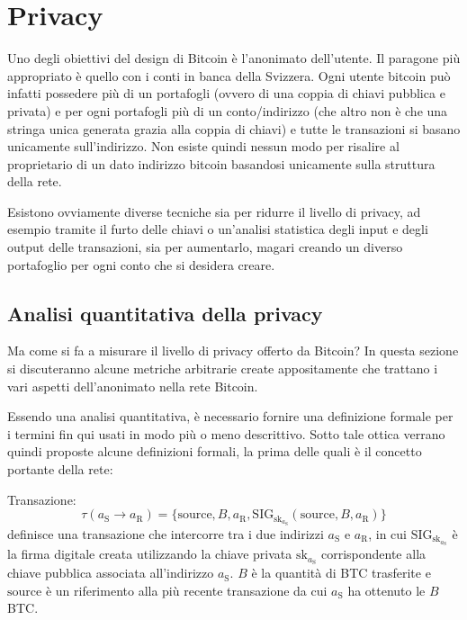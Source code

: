 \chapter{Privacy}\label{privacy}

Uno degli obiettivi del design di Bitcoin è l'anonimato dell'utente. Il paragone più appropriato è quello con i conti in banca della Svizzera. Ogni utente bitcoin può infatti possedere più di un portafogli (ovvero di una coppia di chiavi pubblica e privata) e per ogni portafogli più di un conto/indirizzo (che altro non è che una stringa unica generata grazia alla coppia di chiavi) e tutte le transazioni si basano unicamente sull'indirizzo. Non esiste quindi nessun modo per risalire al proprietario di un dato indirizzo bitcoin basandosi unicamente sulla struttura della rete.

Esistono ovviamente diverse tecniche sia per ridurre il livello di privacy, ad esempio tramite il furto delle chiavi o un'analisi statistica degli input e degli output delle transazioni, sia per aumentarlo, magari creando un diverso portafoglio per ogni conto che si desidera creare.

\section{Analisi quantitativa della privacy}\label{analisi-quantitativa-della-privacy}

Ma come si fa a misurare il livello di privacy offerto da Bitcoin? In questa sezione si discuteranno alcune metriche arbitrarie create appositamente che trattano i vari aspetti dell'anonimato nella rete Bitcoin.

Essendo una analisi quantitativa, è necessario fornire una definizione formale per i termini fin qui usati in modo più o meno descrittivo. Sotto tale ottica verrano quindi proposte alcune definizioni formali, la prima delle quali è il concetto portante della rete:

Transazione:
\[\tau(a_{\textrm{S}} \rightarrow a_{\textrm{R}}) = \{ \textrm{source}, B, a_{\textrm{R}}, \textrm{SIG}_{\textrm{sk}_{a_{\textrm{S}}}}\left(\textrm{source}, B, a_{\textrm{R}}\right) \} \]
definisce una transazione che intercorre tra i due indirizzi $a_{\textrm{S}}$ e $a_{\textrm{R}}$, in cui $\textrm{SIG}_{\textrm{sk}_{a_{\textrm{S}}}}$ è la firma digitale creata utilizzando la chiave privata $\textrm{sk}_{a_\textrm{S}}$ corrispondente alla chiave pubblica associata all'indirizzo $a_\textrm{S}$. $B$ è la quantità di BTC trasferite e $\textrm{source}$ è un riferimento alla più recente transazione da cui $a_\textrm{S}$ ha ottenuto le $B$ BTC.

